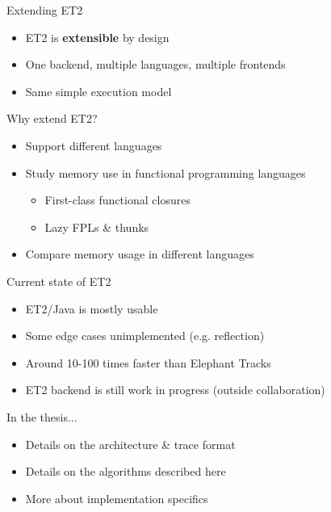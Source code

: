 \documentclass[11pt]{beamer}
\begin{document}
\begin{frame}{Extending ET2}
  \begin{itemize}
  \item ET2 is \textbf{extensible} by design
    \pause
  \item One backend, multiple languages, multiple frontends
    \pause
  \item Same simple execution model
  \end{itemize}
\end{frame}

\begin{frame}{Why extend ET2?}
  \begin{itemize}
  \item Support different languages
    \pause
  \item Study memory use in functional programming languages
    \begin{itemize}
    \item First-class functional closures
    \item Lazy FPLs \& thunks
    \end{itemize}
    \pause 
  \item Compare memory usage in different languages
  \end{itemize}
\end{frame}

\begin{frame}{Current state of ET2}
  \begin{itemize}
  \item ET2/Java is mostly usable
  \item Some edge cases unimplemented (e.g. reflection)
  \item Around 10-100 times faster than Elephant Tracks
  \item ET2 backend is still work in progress (outside collaboration)
  \end{itemize}
\end{frame}

\begin{frame}{In the thesis...}
  \begin{itemize}
  \item Details on the architecture \& trace format
  \item Details on the algorithms described here
  \item More about implementation specifics
  \end{itemize}
\end{frame}
\end{document}
